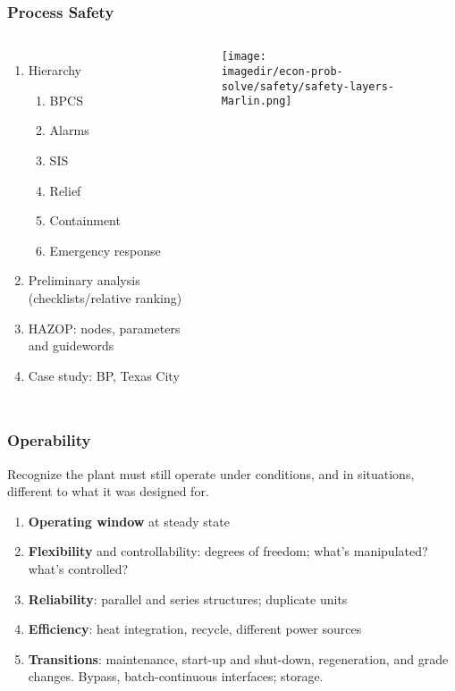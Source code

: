 \begin{frame}\frametitle{Process Safety}
	\begin{columns}[t]
			\begin{enumerate}
				\item	Hierarchy
				\begin{enumerate}
					\item	BPCS
					\item	Alarms
					\item	SIS
					\item	Relief
					\item	Containment
					\item	Emergency response
				\end{enumerate}
				\item	Preliminary analysis (checklists/relative ranking)
				\item	HAZOP: nodes, parameters and guidewords
				\item	Case study: BP, Texas City
			\end{enumerate}
			\vspace{-20pt}
			\begin{center}
				\texttt{[image: \\imagedir/econ-prob-solve/safety/safety-layers-Marlin.png]}
			\end{center}
	\end{columns}	
\end{frame}

\begin{frame}\frametitle{Operability}
	\begin{exampleblock}{}
		Recognize the plant must still operate under conditions, and in situations, different to what it was designed for.
	\end{exampleblock}
	\begin{enumerate}
		\item	\textbf{Operating window} at steady state
		\item	\textbf{Flexibility} and controllability: degrees of freedom; what's manipulated? what's controlled?
		\item	\textbf{Reliability}: parallel and series structures; duplicate units
		\item	\textbf{Efficiency}: heat integration, recycle, different power sources
		\item	\textbf{Transitions}: maintenance, start-up and shut-down, regeneration, and grade changes. Bypass, batch-continuous interfaces; storage.
	\end{enumerate}
\end{frame}

